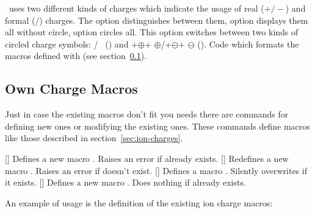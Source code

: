 \documentclass{chemmacros-manual}
\begin{document}
\begin{options}
    \chemmacros\ uses two different kinds of charges which indicate the usage
    of real ($+/-$) and formal (\fplus/\fminus) charges.  The option
     distinguishes between them, option  displays them
    all without circle, option  circles all.
    This option switches between two kinds of circled charge symbols:
     \fplus/ \fminus\ () and
    \verbcode+$\oplus$+ $\oplus$/\verbcode+$\ominus$+ $\ominus$ ().
    Code which formats the macros defined with  (see
    section~\ref{sec:own-charge-macros}).
\end{options}

\subsection{Own Charge Macros}\label{sec:own-charge-macros}
Just in case the existing macros don't fit you needs there are commands for
defining new ones or modifying the existing ones.  These commands define
macros like those described in section~\vref{sec:ion-charges}.

\begin{commands}
  []
    Defines a new macro . Raises an error if  already
    exists.
  []
    Redefines a new macro . Raises an error if  doesn't
    exist.
  []
    Defines a macro .  Silently overwrites  if it exists.
  []
    Defines a new macro .  Does nothing if  already exists.
\end{commands}
An example of usage is the definition of the existing ion charge macros:
\begin{sourcecode}
  \NewChemCharge\fpch{\fplus}
  \NewChemCharge\fmch{\fminus}
\end{sourcecode}
\end{document}
